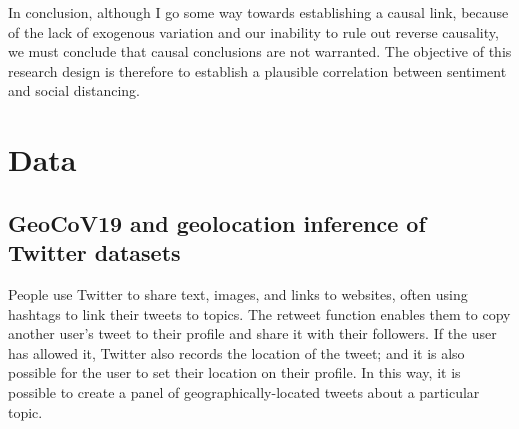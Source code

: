 \documentclass[12pt,a4]{article}
\begin{document}
In conclusion, although I go some way towards establishing a causal link, because of the lack of exogenous variation and our inability to rule out reverse causality, we must conclude that causal conclusions are not warranted. The objective of this research design is therefore to establish a plausible correlation between sentiment and social distancing.


\section{Data}
\subsection{GeoCoV19 and geolocation inference of Twitter datasets}\label{geocov}
People use Twitter to share text, images, and links to websites, often using hashtags to link their tweets to topics. The retweet function enables them to copy another user's tweet to their profile and share it with their followers. If the user has allowed it, Twitter also records the location of the tweet; and it is also possible for the user to set their location on their profile. In this way, it is possible to create a panel of geographically-located tweets about a particular topic. 
\end{document}
